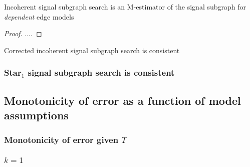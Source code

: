 \begin{thm}
	Incoherent signal subgraph search is an M-estimator of the signal subgraph for \emph{dependent} edge models
\end{thm}

\begin{proof}\label{pf:}
	....
\end{proof}





\begin{thm}
	Corrected incoherent signal subgraph search is consistent
\end{thm}
	







\subsubsection{Star$_1$ signal subgraph search is consistent} %
\label{sub:star__1_signal_subgraph_search_is_consistent}




\subsection{Monotonicity of error as a function of model assumptions} %
\label{sub:monotonicity_of_error_as_a_function_of_model_assumptions}







\subsubsection{Monotonicity of error given $T$} %
\label{ssub:monotonicity_of_error_given_t_}


\subsubsection{$k=1$} %
\label{par:paragraph_name}

